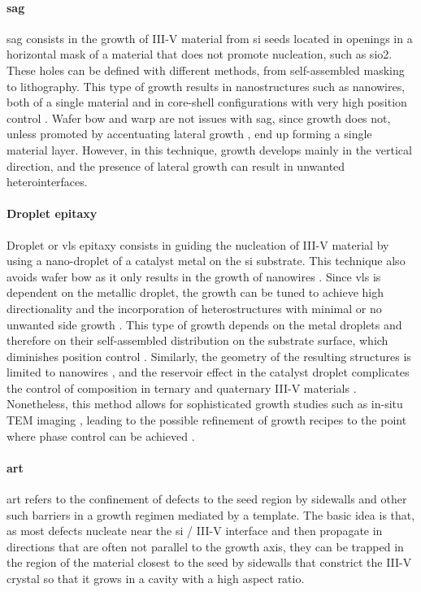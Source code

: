 \paragraph{\Acf{sag}} \acs{sag} consists in the growth of III-V material from \acl{si} seeds located in openings in a horizontal mask of a material that does not promote nucleation, such as \acs{sio2}. These holes can be defined with different methods, from self-assembled masking to lithography. This type of growth results in nanostructures \cite{Cantoro2012} such as nanowires, both of a single material and in core-shell configurations with very high position control \cite{Tomioka2011}. Wafer bow and warp are not issues with \acs{sag}, since growth does not, unless promoted by accentuating lateral growth \cite{McKenzie2023}, end up forming a single material layer. However, in this technique, growth develops mainly in the vertical direction, and the presence of lateral growth can result in unwanted heterointerfaces.
\par
\paragraph{Droplet epitaxy} Droplet or \acf{vls} epitaxy consists in guiding the nucleation of III-V material by using a nano-droplet of a catalyst metal on the \acl{si} substrate. This technique also avoids wafer bow as it only results in the growth of nanowires \cite{Wagner1964}. Since \acs{vls} is dependent on the metallic droplet, the growth can be tuned to achieve high directionality and the incorporation of heterostructures with minimal or no unwanted side growth \cite{Harmand2018, Joyce2007}. This type of growth depends on the metal droplets and therefore on their self-assembled distribution on the substrate surface, which diminishes position control \cite{Joyce2007}. Similarly, the geometry of the resulting structures is limited to nanowires \cite{Wagner1964}, and the reservoir effect in the catalyst droplet complicates the control of composition in ternary and quaternary III-V materials \cite{Dubrovskii2017}. Nonetheless, this method allows for sophisticated growth studies such as in-situ TEM imaging \cite{Harmand2018, Maliakkal2020, Jacobsson2016}, leading to the possible refinement of growth recipes to the point where phase control can be achieved \cite{Algra2008, Joyce2007, Caroff2009}.
\par
\paragraph{\Acf{art}} \acs{art} refers to the confinement of defects to the seed region by sidewalls and other such barriers in a growth regimen mediated by a template. The basic idea is that, as most defects nucleate near the \acl{si} / III-V interface and then propagate in directions that are often not parallel to the growth axis, they can be trapped in the region of the material closest to the seed by sidewalls that constrict the III-V crystal so that it grows in a cavity with a high aspect ratio. 

